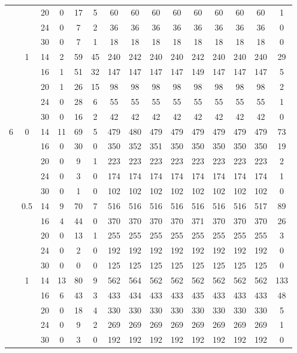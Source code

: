 \documentclass[num-refs]{wiley-article}
\begin{document}
\begin{table}[htbp!]
\begin{tabular}[t]{ccccccccccccccc}
& & 20 & 0 & 17 & 5 & 60 & 60 & 60 & 60 & 60 & 60 & 60 & 60 & 1\\
& & 24 & 0 & 7 & 2 & 36 & 36 & 36 & 36 & 36 & 36 & 36 & 36 & 0\\
& & 30 & 0 & 7 & 1 & 18 & 18 & 18 & 18 & 18 & 18 & 18 & 18 & 0\\
\hline
 & 1 & 14 & 2 & 59 & 45 & 240 & 242 & 240 & 240 & 242 & 240 & 240 & 240 & 29\\
& & 16 & 1 & 51 & 32 & 147 & 147 & 147 & 147 & 149 & 147 & 147 & 147 & 5\\
& & 20 & 1 & 26 & 15 & 98 & 98 & 98 & 98 & 98 & 98 & 98 & 98 & 2\\
& & 24 & 0 & 28 & 6 & 55 & 55 & 55 & 55 & 55 & 55 & 55 & 55 & 1\\
& & 30 & 0 & 16 & 2 & 42 & 42 & 42 & 42 & 42 & 42 & 42 & 42 & 0\\
\hline
6 & 0 & 14 & 11 & 69 & 5 & 479 & 480 & 479 & 479 & 479 & 479 & 479 & 479 & 73\\
& & 16 & 0 & 30 & 0 & 350 & 352 & 351 & 350 & 350 & 350 & 350 & 350 & 19\\
& & 20 & 0 & 9 & 1 & 223 & 223 & 223 & 223 & 223 & 223 & 223 & 223 & 2\\
&& 24 & 0 & 3 & 0 & 174 & 174 & 174 & 174 & 174 & 174 & 174 & 174 & 1\\
& & 30 & 0 & 1 & 0 & 102 & 102 & 102 & 102 & 102 & 102 & 102 & 102 & 0\\
\hline
 & 0.5 & 14 & 9 & 70 & 7 & 516 & 516 & 516 & 516 & 516 & 516 & 516 & 517 & 89\\
& & 16 & 4 & 44 & 0 & 370 & 370 & 370 & 370 & 371 & 370 & 370 & 370 & 26\\
& & 20 & 0 & 13 & 1 & 255 & 255 & 255 & 255 & 255 & 255 & 255 & 255 & 3\\
& & 24 & 0 & 2 & 0 & 192 & 192 & 192 & 192 & 192 & 192 & 192 & 192 & 0\\
& & 30 & 0 & 0 & 0 & 125 & 125 & 125 & 125 & 125 & 125 & 125 & 125 & 0\\
\hline
 & 1 & 14 & 13 & 80 & 9 & 562 & 564 & 562 & 562 & 562 & 562 & 562 & 562 & 133\\
&& 16 & 6 & 43 & 3 & 433 & 434 & 433 & 433 & 435 & 433 & 433 & 433 & 48\\
& & 20 & 0 & 18 & 4 & 330 & 330 & 330 & 330 & 330 & 330 & 330 & 330 & 5\\
& & 24 & 0 & 9 & 2 & 269 & 269 & 269 & 269 & 269 & 269 & 269 & 269 & 1\\
& & 30 & 0 & 3 & 0 & 192 & 192 & 192 & 192 & 192 & 192 & 192 & 192 & 0\\
\hline
\end{tabular}
\label{scen2:issues}
\end{table}
\end{document}
